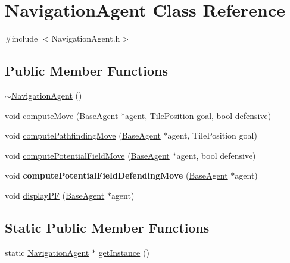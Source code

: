 \hypertarget{class_navigation_agent}{\section{Navigation\-Agent Class Reference}
\label{class_navigation_agent}
}


{\ttfamily \#include $<$Navigation\-Agent.\-h$>$}

\subsection*{Public Member Functions}
\begin{DoxyCompactItemize}
\item 
\hyperlink{class_navigation_agent_a84f0b71064dec4510ed89f8462b7f88f}{$\sim$\-Navigation\-Agent} ()
\item 
void \hyperlink{class_navigation_agent_a5539e6251fd6545340db21fead6b9be8}{compute\-Move} (\hyperlink{class_base_agent}{Base\-Agent} $\ast$agent, Tile\-Position goal, bool defensive)
\item 
void \hyperlink{class_navigation_agent_a296e6e934a56440807933ab9552cec4c}{compute\-Pathfinding\-Move} (\hyperlink{class_base_agent}{Base\-Agent} $\ast$agent, Tile\-Position goal)
\item 
void \hyperlink{class_navigation_agent_a9cab8df64c0079f786b137b601d64cb5}{compute\-Potential\-Field\-Move} (\hyperlink{class_base_agent}{Base\-Agent} $\ast$agent, bool defensive)
\item 
\hypertarget{class_navigation_agent_a34d013eef5b8fb5434a5506a570181eb}{void {\bfseries compute\-Potential\-Field\-Defending\-Move} (\hyperlink{class_base_agent}{Base\-Agent} $\ast$agent)}\label{class_navigation_agent_a34d013eef5b8fb5434a5506a570181eb}

\item 
void \hyperlink{class_navigation_agent_a608f7b54a28c2fe273ee2d726265dfce}{display\-P\-F} (\hyperlink{class_base_agent}{Base\-Agent} $\ast$agent)
\end{DoxyCompactItemize}
\subsection*{Static Public Member Functions}
\begin{DoxyCompactItemize}
\item 
static \hyperlink{class_navigation_agent}{Navigation\-Agent} $\ast$ \hyperlink{class_navigation_agent_aaa13ab0c04f9c1be76b177a37813e580}{get\-Instance} ()
\end{DoxyCompactItemize}


